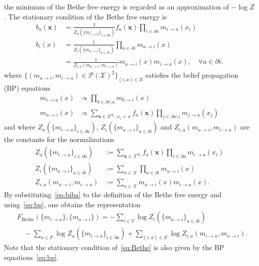 \documentclass[a4paper,10pt,twoside,twocolumn,openany,final]{memoir}
\theoremstyle{plain}
\theoremstyle{definition}
\theoremstyle{remark}
\begin{document}
the minimum of the Bethe free energy is regarded as an approximation of $-\log Z$.
The stationary condition of the Bethe free energy is
\begin{equation}
\begin{split}
b_a(\bm{x}) &= \frac1{Z_a(\{m_{i\to a}\}_{i\in\partial a})} f_a(\bm{x})\prod_{i\in\partial a} m_{i\to a}(x_i)\\
b_i(x) &= \frac1{Z_i(\{m_{a\to i}\}_{a\in\partial i})} \prod_{a\in\partial i} m_{a\to i}(x)\\
&= \frac1{Z_{i,a}(m_{a\to i}, m_{i\to a})} m_{a\to i}(x)m_{i\to a}(x),\quad \forall a\in\partial i.
\end{split}
\label{eq:biba}
\end{equation}
where 
$\{(m_{a\to i}, m_{i\to a})\in\mathcal{P}(\mathcal{X})^2\}_{(i,a)\in E}$ satisfies
the belief propagation (BP) equations
\begin{equation}
\begin{split}
m_{i\to a}(x) &\propto \prod_{b\in\partial i\setminus a} m_{b\to i}(x)\\
m_{a\to i}(x) &\propto \sum_{\bm{x}\in\mathcal{X}^{d_a}, x_i=x}f_a(\bm{x})\prod_{j\in\partial a\setminus i} m_{j\to a}(x_j)
\end{split}
\label{eq:bp}
\end{equation}
and where
$Z_a(\{m_{i\to a}\}_{i\in\partial a})$, $Z_i(\{m_{a\to i}\}_{a\in\partial i})$ and $Z_{i,a}(m_{a\to i}, m_{i\to a})$
are the constants for the normalizations
\begin{align*}
Z_a(\{m_{i\to a}\}_{i\in\partial a}) &:= \sum_{\bm{x}\in\mathcal{X}^{d_a}}f_a(\bm{x})\prod_{i\in\partial a} m_{i\to a}(x_i)\\
Z_i(\{m_{a\to i}\}_{a\in\partial i}) &:= \sum_{x\in\mathcal{X}} \prod_{a\in\partial i} m_{a\to i}(x)\\
Z_{i,a}(m_{a\to i}, m_{i\to a}) &:= \sum_{x\in\mathcal{X}} m_{a\to i}(x)m_{i\to a}(x).
\end{align*}
By substituting~\eqref{eq:biba} to the definition of the Bethe free energy and using~\eqref{eq:bp},
one obtains the representation
\begin{align}
&F_\mathrm{Bethe}(\{m_{i\to a}\}, \{m_{a\to i}\})
=
-\sum_{i\in V} \log Z_i(\{m_{a\to i}\}_{a\in\partial i})
\label{eq:Bethe}\\
&\quad -\sum_{a\in F} \log Z_a(\{m_{i\to a}\}_{i\in\partial a})
 +\sum_{(i,a)\in E} \log Z_{i,a}(m_{i\to a}, m_{a\to i}).\nonumber
\end{align}
Note that the stationary condition of~\eqref{eq:Bethe} is also given by the BP equations~\eqref{eq:bp}.
\end{document}
